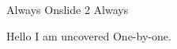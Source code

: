 \documentclass{beamer}
\begin{document}
\begin{frame}
    Always
    Onslide 2
    \onslide
    Always
\end{frame}

\begin{frame}
    Hello \pause
    I am uncovered \pause
    One-by-one.
\end{frame}

\begin{frame}
\end{frame}
\end{document}
